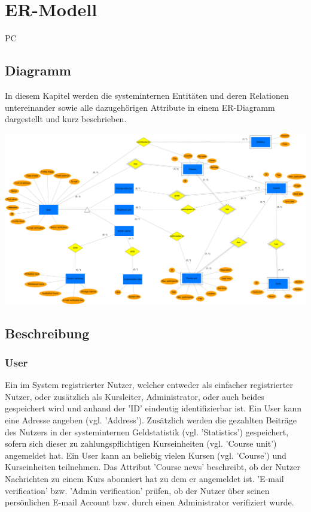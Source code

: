 \chapter{ER-Modell}

\begin{tiny}
PC
\end{tiny}

\section{Diagramm}

In diesem Kapitel werden die systeminternen Entitäten und deren Relationen untereinander sowie alle dazugehörigen Attribute in einem ER-Diagramm dargestellt und kurz beschrieben.

\includegraphics[scale=0.085]{./Grafiken/ER-Diagramm.pdf}

\section{Beschreibung}
\subsection{User}
Ein im System registrierter Nutzer, welcher entweder als einfacher registrierter Nutzer, oder zusätzlich als Kursleiter, Administrator, oder auch beides gespeichert wird und anhand der 'ID' eindeutig identifizierbar ist. Ein User kann eine Adresse angeben (vgl. 'Address'). Zusätzlich werden die gezahlten Beiträge des Nutzers in der systeminternen Geldstatistik (vgl. 'Statistics') gespeichert, sofern sich dieser zu zahlungspflichtigen Kurseinheiten (vgl. 'Course unit') angemeldet hat. Ein User kann an beliebig vielen Kursen (vgl. 'Course') und Kurseinheiten teilnehmen. Das Attribut 'Course news' beschreibt, ob der Nutzer Nachrichten zu einem Kurs abonniert hat zu dem er angemeldet ist. 'E-mail verification' bzw. 'Admin verification' prüfen, ob der Nutzer über seinen persönlichen E-mail Account bzw. durch einen Administrator verifiziert wurde.

